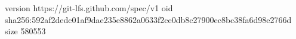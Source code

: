 version https://git-lfs.github.com/spec/v1
oid sha256:592af2dedc01af9dae235e8862a0633f2ce0db8c27900ec8bc38fa6d98e2766d
size 580553
